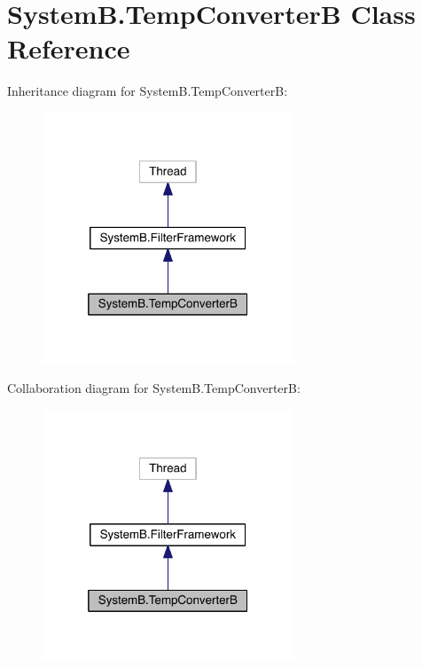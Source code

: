 \hypertarget{class_system_b_1_1_temp_converter_b}{}\section{System\+B.\+Temp\+Converter\+B Class Reference}
\label{class_system_b_1_1_temp_converter_b}


Inheritance diagram for System\+B.\+Temp\+Converter\+B\+:
\nopagebreak
\begin{figure}[H]
\begin{center}
\leavevmode
\includegraphics[width=212pt]{class_system_b_1_1_temp_converter_b__inherit__graph}
\end{center}
\end{figure}


Collaboration diagram for System\+B.\+Temp\+Converter\+B\+:
\nopagebreak
\begin{figure}[H]
\begin{center}
\leavevmode
\includegraphics[width=212pt]{class_system_b_1_1_temp_converter_b__coll__graph}
\end{center}
\end{figure}
